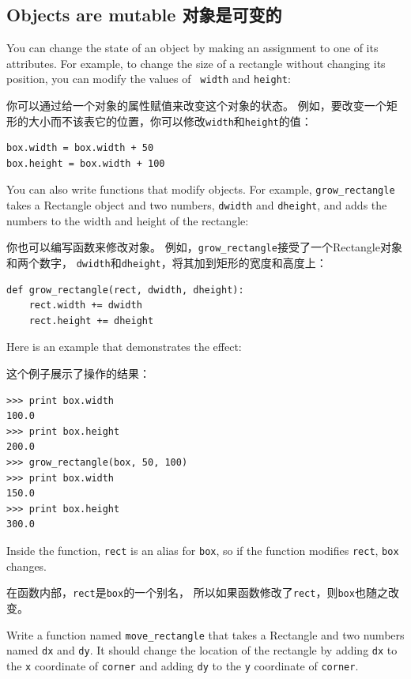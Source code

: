 \documentclass[10pt]{book}
\begin{document}
\begin{CJK}{UTF8}{gbsn}
\section{Objects are mutable 对象是可变的}

You can change the state of an object by making an assignment to one of
its attributes.  For example, to change the size of a rectangle
without changing its position, you can modify the values of {\tt
width} and {\tt height}:

你可以通过给一个对象的属性赋值来改变这个对象的状态。
例如，要改变一个矩形的大小而不该表它的位置，你可以修改{\tt width}和{\tt height}的值：

\begin{verbatim}
box.width = box.width + 50
box.height = box.width + 100
\end{verbatim}
%
You can also write functions that modify objects.  For example,
\verb"grow_rectangle" takes a Rectangle object and two numbers,
{\tt dwidth} and {\tt dheight}, and adds the numbers to the
width and height of the rectangle:

你也可以编写函数来修改对象。
例如，\verb"grow_rectangle"接受了一个Rectangle对象和两个数字，
{\tt dwidth}和{\tt dheight}，将其加到矩形的宽度和高度上：

\begin{verbatim}
def grow_rectangle(rect, dwidth, dheight):
    rect.width += dwidth
    rect.height += dheight
\end{verbatim}
%
Here is an example that demonstrates the effect:

这个例子展示了操作的结果：

\begin{verbatim}
>>> print box.width
100.0
>>> print box.height
200.0
>>> grow_rectangle(box, 50, 100)
>>> print box.width
150.0
>>> print box.height
300.0
\end{verbatim}
%
Inside the function, {\tt rect} is an
alias for {\tt box}, so if the function modifies {\tt rect}, 
{\tt box} changes.

在函数内部，{\tt rect}是{\tt box}的一个别名，
所以如果函数修改了{\tt rect}，则{\tt box}也随之改变。

\begin{exercise}

Write a function named \verb"move_rectangle" that takes
a Rectangle and two numbers named {\tt dx} and {\tt dy}.  It
should change the location of the rectangle by adding {\tt dx}
to the {\tt x} coordinate of {\tt corner} and adding {\tt dy}
to the {\tt y} coordinate of {\tt corner}.


\end{exercise}
\end{CJK}
\end{document}

